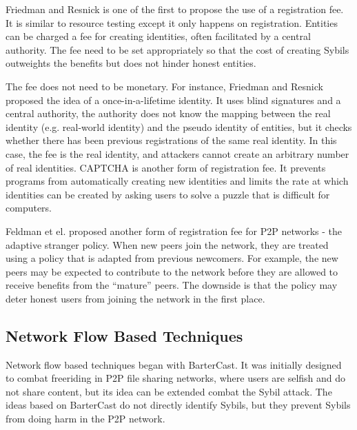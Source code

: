 Friedman and Resnick is one of the first to propose the use of a registration
fee\cite{resnick2001social}. It is similar to resource testing except it only
happens on registration. Entities can be charged a fee for creating identities,
often facilitated by a central authority. The fee need to be set appropriately
so that the cost of creating Sybils outweights the benefits but does not hinder
honest entities.

The fee does not need to be monetary. For instance, Friedman and Resnick
proposed the idea of a once-in-a-lifetime identity\cite{resnick2001social}. It
uses blind signatures and a central authority, the authority does not know the
mapping between the real identity (e.g. real-world identity) and the pseudo
identity of entities, but it checks whether there has been previous
registrations of the same real identity. In this case, the fee is the real
identity, and attackers cannot create an arbitrary number of real identities.
CAPTCHA\cite{von2003captcha} is another form of registration fee. It prevents
programs from automatically creating new identities and limits the rate at which
identities can be created by asking users to solve a puzzle that is difficult
for computers.

Feldman et el. proposed another form of registration fee for P2P networks - the
adaptive stranger policy\cite{feldman2004robust}. When new peers join the
network, they are treated using a policy that is adapted from previous
newcomers. For example, the new peers may be expected to contribute to the
network before they are allowed to receive benefits from the ``mature'' peers.
The downside is that the policy may deter honest users from joining the network
in the first place.


\subsection{Network Flow Based Techniques}\label{sec:network-flow}
Network flow based techniques began with
BarterCast\cite{meulpolder2009bartercast}. It was initially designed to combat
freeriding in P2P file sharing networks, where users are selfish and do not
share content, but its idea can be extended combat the Sybil attack. The ideas
based on BarterCast do not directly identify Sybils, but they prevent Sybils
from doing harm in the P2P network.

